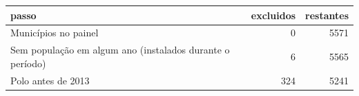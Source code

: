 \begin{tabular}{lrr}
\toprule
passo & excluidos & restantes \\
\midrule
Municípios no painel & 0 & 5571 \\
Sem população em algum ano (instalados durante o período) & 6 & 5565 \\
Polo antes de 2013 & 324 & 5241 \\
\bottomrule
\end{tabular}
